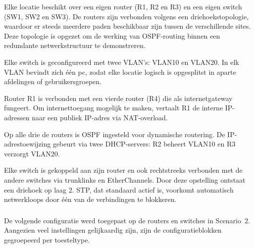 \vspace{0.3cm}

Elke locatie beschikt over een eigen router (R1, R2 en R3) en een eigen switch (SW1, SW2 en SW3). De routers zijn verbonden volgens een driehoekstopologie, waardoor er steeds meerdere paden beschikbaar zijn tussen de verschillende sites. Deze topologie is opgezet om de werking van OSPF-routing binnen een redundante netwerkstructuur te demonstreren.

\vspace{0.3cm}

Elke switch is geconfigureerd met twee VLAN’s: VLAN10 en VLAN20. In elk VLAN bevindt zich één pc, zodat elke locatie logisch is opgesplitst in aparte afdelingen of gebruikersgroepen.

\vspace{0.3cm}

Router R1 is verbonden met een vierde router (R4) die als internetgateway fungeert. Om internettoegang mogelijk te maken, vertaalt R1 de interne IP-adressen naar een publiek IP-adres via NAT-overload.

\vspace{0.3cm}

Op alle drie de routers is OSPF ingesteld voor dynamische routering. De IP-adrestoewijzing gebeurt via twee DHCP-servers: R2 beheert VLAN10 en R3 verzorgt VLAN20.


\vspace{0.3cm}

Elke switch is gekoppeld aan zijn router en ook rechtstreeks verbonden met de andere switches via trunklinks en EtherChannels. Door deze opstelling ontstaat een driehoek op laag 2. STP, dat standaard actief is, voorkomt automatisch netwerkloops door één van de verbindingen te blokkeren.


\subsubsection{}
\label{sec:configuratie-PacketTracer}

De volgende configuratie werd toegepast op de routers en switches in Scenario~2. Aangezien veel instellingen gelijkaardig zijn, zijn de configuratieblokken gegroepeerd per toesteltype.

\vspace{0.3cm}

